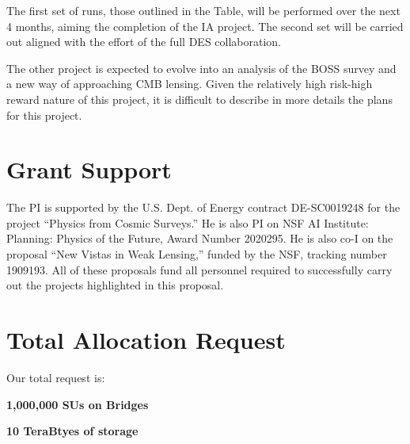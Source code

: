 \documentclass[12pt]{article}
\begin{document}
\begin{small}

The first set of runs, those outlined in the Table, will be performed over the next 4 months, aiming the completion of the IA project. The second set will be carried out aligned with the effort of the full DES collaboration.

The other project is expected to evolve into an analysis of the BOSS survey and a new way of approaching CMB lensing. Given the relatively high risk-high reward nature of this project, it is difficult to describe in more details the plans for this project.

\section{Grant Support}

The PI is supported by the U.S. Dept. of Energy contract DE-SC0019248 for the project ``Physics from Cosmic Surveys.'' He is also PI on NSF AI Institute: Planning: Physics of the Future, Award Number 2020295. He is also co-I on the proposal ``New Vistas in Weak Lensing,'' funded by the NSF, tracking number 1909193. All of these proposals fund all personnel required to successfully carry out the projects highlighted in this proposal.

\section{Total Allocation Request}

Our total request is:

{\bf 1,000,000 SUs on Bridges}

{\bf 10 TeraBtyes of storage}

\end{small}




\end{document}
